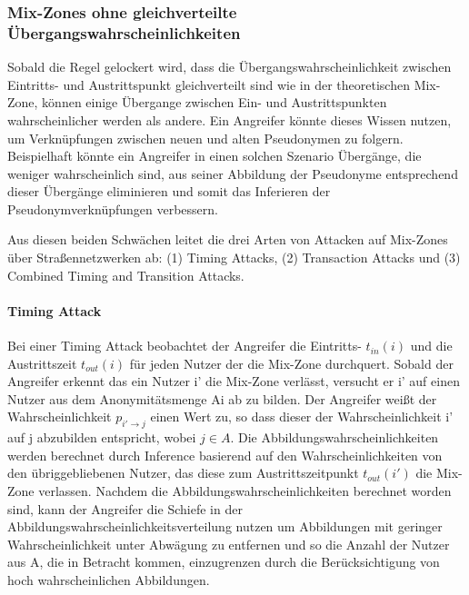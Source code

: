 \subsubsection{Mix-Zones ohne gleichverteilte Übergangswahrscheinlichkeiten} Sobald die Regel gelockert wird, dass die Übergangswahrscheinlichkeit zwischen Eintritts- und Austrittspunkt gleichverteilt sind wie in der theoretischen Mix-Zone, können einige Übergange zwischen Ein- und Austrittspunkten wahrscheinlicher werden als andere. Ein Angreifer könnte dieses Wissen nutzen, um  Verknüpfungen zwischen neuen und alten Pseudonymen zu folgern. Beispielhaft könnte ein Angreifer in einen solchen Szenario Übergänge, die weniger wahrscheinlich sind, aus seiner Abbildung der Pseudonyme entsprechend dieser Übergänge eliminieren und somit das Inferieren der Pseudonymverknüpfungen verbessern.

Aus diesen beiden Schwächen leitet \cite{Palanisamy2015} die drei Arten von Attacken auf Mix-Zones über Straßennetzwerken ab: (1) Timing Attacks, (2) Transaction Attacks und (3) Combined  Timing and Transition Attacks.

\paragraph{Timing Attack} Bei einer Timing Attack beobachtet der Angreifer die Eintritts- $t_{in}(i)$ und die Austrittszeit $t_{out}(i)$ für jeden Nutzer der die Mix-Zone durchquert. Sobald der Angreifer erkennt das ein Nutzer i' die Mix-Zone verlässt, versucht er i' auf einen Nutzer aus dem Anonymitätsmenge Ai ab zu bilden. Der Angreifer weißt der Wahrscheinlichkeit $p_{i'\rightarrow j}$ einen Wert zu, so dass dieser der Wahrscheinlichkeit i' auf j abzubilden entspricht, wobei $j \in A$. Die Abbildungswahrscheinlichkeiten werden berechnet durch Inference basierend auf den Wahrscheinlichkeiten von den übriggebliebenen Nutzer, das diese zum Austrittszeitpunkt $t_{out}(i')$ die Mix-Zone verlassen.  Nachdem die Abbildungswahrscheinlichkeiten berechnet worden sind, kann der Angreifer die Schiefe in der Abbildungswahrscheinlichkeitsverteilung nutzen um Abbildungen mit geringer Wahrscheinlichkeit  unter Abwägung zu entfernen und so die Anzahl der Nutzer aus A, die in Betracht kommen, einzugrenzen durch die Berücksichtigung von hoch wahrscheinlichen  Abbildungen.

